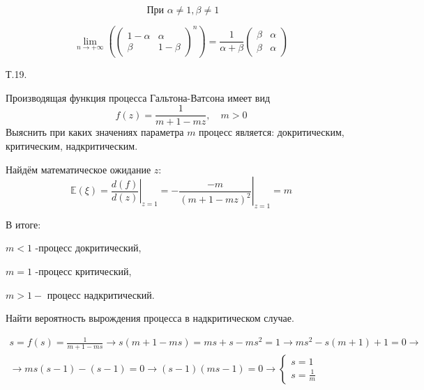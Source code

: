 \documentclass[a4paper,12pt]{article} %
\begin{document}
\begin{example}
$$
\text { При } \alpha \neq 1, \beta \neq 1
$$

$$
\lim _{n \rightarrow+\infty}\left(\left(\begin{array}{cc}
1-\alpha & \alpha \\
\beta & 1-\beta
\end{array}\right)^{n}\right)=\frac{1}{\alpha+\beta}\left(\begin{array}{cc}
\beta & \alpha \\
\beta & \alpha
\end{array}\right)
$$



\end{example}







\begin{example} Т.19. 


Производящая функция процесса Гальтона-Ватсона имеет вид
$$
f(z)=\frac{1}{m+1-m z}, \quad m>0
$$
Выяснить при каких значениях параметра $m$ процесс является: докритическим, критическим, надкритическим. 





Найдём математическое ожидание $ z $:
$$
\mathbb{E}(\xi)=\left.\frac{d(f)}{d(z)}\right|_{z=1}=-\left.\frac{-m}{(m+1-m z)^{2}}\right|_{z=1}=m
$$

В итоге:

$m<1$ -процесс докритический, 

$m=1$ -процесс критический, 

$m>1-$ процесс надкритический.








Найти вероятность вырождения процесса в надкритическом случае. 




\[ \begin{array}{c}
s=f(s)=\frac{1}{m+1-m s} \rightarrow s(m+1-m s)=m s+s-m s^{2}=1 \rightarrow m s^{2}-s(m+1)+1=0 \rightarrow \\
\rightarrow m s(s-1)-(s-1)=0 \rightarrow(s-1)(m s-1)=0 \rightarrow\left\{\begin{array}{l}
s=1 \\
s=\frac{1}{m}
\end{array}\right.
\end{array} \]











\end{example}
\end{document}
